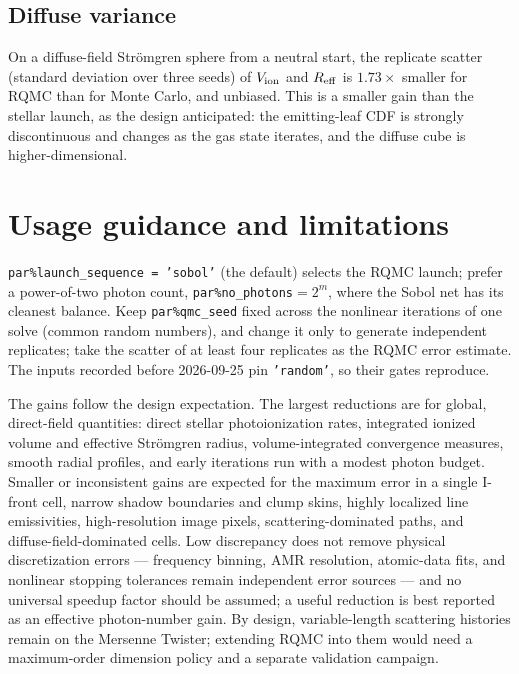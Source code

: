 \documentclass[english,a4paper]{my_memo}
\newcommand{\code}[1]{\texttt{#1}}
\begin{document}
\subsection{Diffuse variance}
On a diffuse-field Str\"omgren sphere from a neutral start, the replicate scatter
(standard deviation over three seeds) of $V_{\rm ion}$ and $R_{\rm eff}$ is
$1.73\times$ smaller for RQMC than for Monte Carlo, and unbiased.  This is a
smaller gain than the stellar launch, as the design anticipated: the emitting-leaf
CDF is strongly discontinuous and changes as the gas state iterates, and the
diffuse cube is higher-dimensional.

\section{Usage guidance and limitations}
\code{par\%launch\_sequence = 'sobol'} (the default) selects the RQMC launch; prefer a
power-of-two photon count, \code{par\%no\_photons}${} = 2^m$, where the Sobol net has its
cleanest balance.  Keep \code{par\%qmc\_seed} fixed across the nonlinear
iterations of one solve (common random numbers), and change it only to generate
independent replicates; take the scatter of at least four replicates as the RQMC
error estimate.  The inputs recorded before 2026-09-25 pin \code{'random'}, so
their gates reproduce.

The gains follow the design expectation.  The largest reductions are for global,
direct-field quantities: direct stellar photoionization rates, integrated
ionized volume and effective Str\"omgren radius, volume-integrated convergence
measures, smooth radial profiles, and early iterations run with a modest photon
budget.  Smaller or inconsistent gains are expected for the maximum error in a
single I-front cell, narrow shadow boundaries and clump skins, highly localized
line emissivities, high-resolution image pixels, scattering-dominated paths, and
diffuse-field-dominated cells.  Low discrepancy does not remove physical
discretization errors --- frequency binning, AMR resolution, atomic-data fits,
and nonlinear stopping tolerances remain independent error sources --- and no
universal speedup factor should be assumed; a useful reduction is best reported
as an effective photon-number gain.  By design, variable-length scattering
histories remain on the Mersenne Twister; extending RQMC into them would need a
maximum-order dimension policy and a separate validation campaign.
\end{document}
